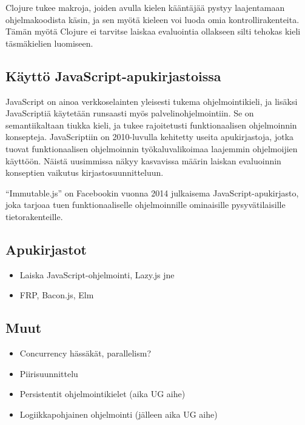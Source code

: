 Clojure tukee makroja, joiden avulla kielen kääntäjää pystyy laajentamaan ohjelmakoodista käsin, ja sen myötä kieleen voi luoda omia kontrollirakenteita. Tämän myötä Clojure ei tarvitse laiskaa evaluointia ollakseen silti tehokas kieli täsmäkielien luomiseen.

\subsection{Käyttö JavaScript-apukirjastoissa}

JavaScript on ainoa verkkoselainten yleisesti tukema ohjelmointikieli, ja lisäksi JavaScriptiä käytetään runsaasti myös palvelinohjelmointiin. Se on semantiikaltaan tiukka kieli, ja tukee rajoitetusti funktionaalisen ohjelmoinnin konsepteja.  JavaScriptiin on 2010-luvulla kehitetty useita apukirjastoja, jotka tuovat funktionaalisen ohjelmoinnin työkaluvalikoimaa laajemmin ohjelmoijien käyttöön. Näistä uusimmissa näkyy kasvavissa määrin laiskan evaluoinnin konseptien vaikutus kirjastosuunnitteluun.

``Immutable.js'' on Facebookin vuonna 2014 julkaisema JavaScript-apukirjasto, joka tarjoaa tuen funktionaaliselle ohjelmoinnille ominaisille pysyvätilaisille tietorakenteille.

\subsection{Apukirjastot}
\begin{itemize}
  \item{Laiska JavaScript-ohjelmointi, Lazy.js jne}
  \item{FRP, Bacon.js, Elm \citep{czaplicki2012elm}}
\end{itemize}
\subsection{Muut}
\begin{itemize}
  \item{Concurrency hässäkät, parallelism?}
  \item{Piirisuunnittelu \citep{charlton1991lazy}}
  \item{Persistentit ohjelmointikielet (aika UG aihe) \citep{wevers2014persistent}}
  \item{Logiikkapohjainen ohjelmointi (jälleen aika UG aihe) \citep{alpuente1997specialization}}
\end{itemize}


